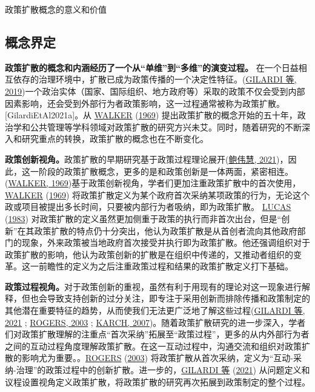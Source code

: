 \documentclass[
  12pt,
]{ctexart}
\begin{document}
政策扩散概念的意义和价值

\hypertarget{ux6982ux5ff5ux754cux5b9a}{%
\subsection{概念界定}\label{ux6982ux5ff5ux754cux5b9a}}

\textbf{政策扩散的概念和内涵经历了一个从``单维''到``多维''的演变过程。}
在一个日益相互依存的治理环境中，扩散已成为政策传播的一个决定性特征。(\protect\hyperlink{ref-GilardiWasserfallen2019}{GILARDI 等, 2019})一个政治实体（国家、国际组织、地方政府等）采取的政策不仅会受到内部因素影响，还会受到外部行为者政策影响，这一过程通常被称为政策扩散。{[}GilardiEtAl2021a{]}。从 \protect\hyperlink{ref-Walker1969}{WALKER} (\protect\hyperlink{ref-Walker1969}{1969}) 提出政策扩散的概念开始的五十年，政治学和公共管理等学科领域对政策扩散的研究方兴未艾。同时，随着研究的不断深入和研究重点的转换，政策扩散的概念也在不断变化。

\textbf{政策创新视角。}政策扩散的早期研究基于政策过程理论展开(\protect\hyperlink{ref-BaoWeiHui2021}{鲍伟慧, 2021})，因此，这一阶段的政策扩散概念，更多的是和政策创新是一体两面，紧密相连。(\protect\hyperlink{ref-Walker1969}{WALKER, 1969})基于政策创新视角，学者们更加注重政策扩散中的首次使用， \protect\hyperlink{ref-Walker1969}{WALKER} (\protect\hyperlink{ref-Walker1969}{1969}) 将政策扩散定义为某个政府首次采纳某项政策的行为，无论这个政或项目被提出多长时间，只要被内部行为者吸纳，即为政策扩散。 \protect\hyperlink{ref-Lucas1983}{LUCAS} (\protect\hyperlink{ref-Lucas1983}{1983}) 对政策扩散的定义虽然更加侧重于政策的执行而非首次出台，但是``创新''在其政策扩散的特点仍十分突出，他认为政策扩散是从首创者流向其他政府部门的现象，外来政策被当地政府首次接受并执行即为政策扩散。他还强调组织对于政策扩散的影响，他认为政策创新的扩散是在组织中传递的，又推动者组织的变革。这一前瞻性的定义为之后注重政策过程和结果的政策扩散定义打下基础。

\textbf{政策过程视角。}对于政策创新的重视，虽然有利于用现有的理论对这一现象进行解释，但也会导致支持创新的过分关注，即专注于采用创新而排除传播和政策制定的其他潜在重要特征的趋势，从而使我们无法更广泛地了解这些过程(\protect\hyperlink{ref-GilardiEtAl2021}{GILARDI 等, 2021} ; \protect\hyperlink{ref-Rogers2003}{ROGERS, 2003} ; \protect\hyperlink{ref-Karch2007}{KARCH, 2007})。随着政策扩散研究的进一步深入，学者们对政策扩散理解的注重点``首次采纳''拓展至``政策过程''，更多的从内外部行为者之间的互动过程角度理解政策扩散。在这一互动过程中，沟通交流和组织对政策扩散的影响尤为重要。。\protect\hyperlink{ref-Rogers2003}{ROGERS} (\protect\hyperlink{ref-Rogers2003}{2003}) 将政策扩散从首次采纳，定义为``互动-采纳-治理''的政策过程中的创新扩散。进一步的，\protect\hyperlink{ref-GilardiEtAl2021}{GILARDI 等} (\protect\hyperlink{ref-GilardiEtAl2021}{2021}) 从问题定义和议程设置视角定义政策扩散，将政策扩散的研究再次拓展到政策制定的整个过程。
\end{document}
